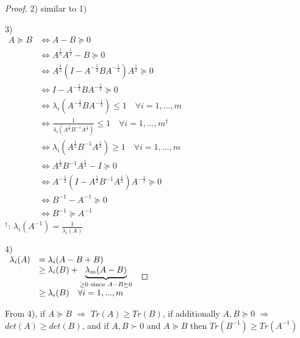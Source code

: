 \begin{multicols}{2}
\begin{proof}
    2) similar to 1)

    3) \\
    $\begin{array}{ll}
        A \succeq B & \Longleftrightarrow A-B\succeq 0 \\
                    & \Longleftrightarrow A^{\frac{1}{2}}A^{\frac{1}{2}} - B \succeq 0 \\
                    & \Longleftrightarrow A^{\frac{1}{2}}(I-A^{-\frac{1}{2}}BA^{-\frac{1}{2}})A^{\frac{1}{2}} \succeq 0 \\
                    & \Longleftrightarrow I-A^{-\frac{1}{2}}BA^{-\frac{1}{2}} \succeq 0 \\
                    & \Longleftrightarrow \lambda_i(A^{-\frac{1}{2}}BA^{-\frac{1}{2}} ) \leq 1 \quad \forall i = 1,...,m \\
                    & \Longleftrightarrow \frac{1}{\lambda_i(A^{\frac{1}{2}}B^{-1}A^{\frac{1}{2}} )} \leq 1 \quad \forall i = 1,...,m ^\dagger\\
                    & \Longleftrightarrow \lambda_i(A^{\frac{1}{2}}B^{-1}A^{\frac{1}{2}} ) \geq 1 \quad \forall i = 1,...,m \\
                    & \Longleftrightarrow A^{\frac{1}{2}}B^{-1}A^{\frac{1}{2}} - I \succeq 0 \\
                    & \Longleftrightarrow A^{-\frac{1}{2}}(I-A^{\frac{1}{2}}B^{-1}A^{\frac{1}{2}})A^{-\frac{1}{2}} \succeq 0 \\
                    & \Longleftrightarrow B^{-1} - A^{-1} \succeq 0 \\
                    & \Longleftrightarrow B^{-1} \succeq A^{-1}
    \end{array}$ \\
    $^\dagger$: $\lambda_i(A^{-1})=\frac{1}{\lambda_i(A)}$
    
    4) \\
    $\begin{array}{ll}
        \lambda_i(A)    &=      \lambda_i(A-B+B) \\
                        &\geq   \lambda_i(B) + \underbrace{\lambda_m(A-B)}_{\geq 0 \text{ \rm since }A-B\succeq 0} \\
                        &\geq   \lambda_i(B) \quad \forall i=1,...,m
    \end{array}$
\end{proof}
From 4), if $A\succeq B$ $\Longrightarrow$ $Tr(A)\geq Tr(B)$, if additionally $A,B \succeq 0$ $\Longrightarrow$ $det(A) \geq det(B)$, and if $A,B \succ 0$ and $A\succeq B$ then $Tr(B^{-1})\geq Tr(A^{-1})$


\end{multicols}
